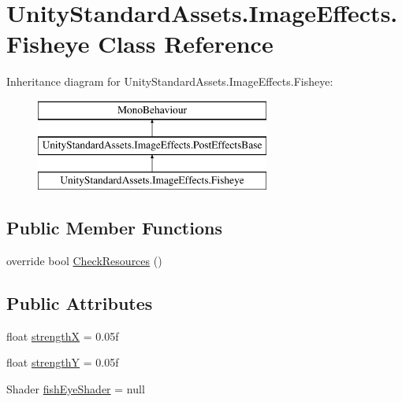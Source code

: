 \hypertarget{class_unity_standard_assets_1_1_image_effects_1_1_fisheye}{}\section{Unity\+Standard\+Assets.\+Image\+Effects.\+Fisheye Class Reference}
\label{class_unity_standard_assets_1_1_image_effects_1_1_fisheye}
Inheritance diagram for Unity\+Standard\+Assets.\+Image\+Effects.\+Fisheye\+:\begin{figure}[H]
\begin{center}
\leavevmode
\includegraphics[height=3.000000cm]{class_unity_standard_assets_1_1_image_effects_1_1_fisheye}
\end{center}
\end{figure}
\subsection*{Public Member Functions}
\begin{DoxyCompactItemize}
\item 
override bool \mbox{\hyperlink{class_unity_standard_assets_1_1_image_effects_1_1_fisheye_aab758a8fa12b52a196cec8cdd9e66c03}{Check\+Resources}} ()
\end{DoxyCompactItemize}
\subsection*{Public Attributes}
\begin{DoxyCompactItemize}
\item 
float \mbox{\hyperlink{class_unity_standard_assets_1_1_image_effects_1_1_fisheye_ac744dacc09e3b47d06a5022671ec92cd}{strengthX}} = 0.\+05f
\item 
float \mbox{\hyperlink{class_unity_standard_assets_1_1_image_effects_1_1_fisheye_ac9a0d9f7b2b959fbd2c11ecc7148df46}{strengthY}} = 0.\+05f
\item 
Shader \mbox{\hyperlink{class_unity_standard_assets_1_1_image_effects_1_1_fisheye_a4c87877e346e53dbfe52b106a8b01f28}{fish\+Eye\+Shader}} = null
\end{DoxyCompactItemize}
